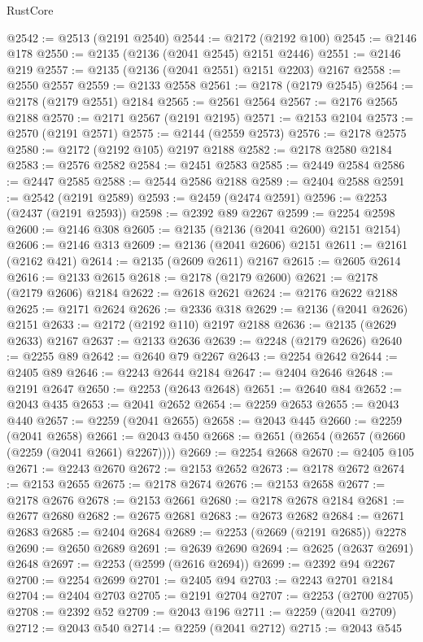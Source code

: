 \begin{lexlean}{RustCore}
\begin{coremodule}
@2542 := @2513 (@2191 @2540)
@2544 := @2172 (@2192 @100)
@2545 := @2146 @178
@2550 := @2135 (@2136 (@2041 @2545) @2151 @2446)
@2551 := @2146 @219
@2557 := @2135 (@2136 (@2041 @2551) @2151 @2203) @2167
@2558 := @2550 @2557
@2559 := @2133 @2558
@2561 := @2178 (@2179 @2545)
@2564 := @2178 (@2179 @2551) @2184
@2565 := @2561 @2564
@2567 := @2176 @2565 @2188
@2570 := @2171 @2567 (@2191 @2195)
@2571 := @2153 @2104
@2573 := @2570 (@2191 @2571)
@2575 := @2144 (@2559 @2573)
@2576 := @2178 @2575
@2580 := @2172 (@2192 @105) @2197 @2188
@2582 := @2178 @2580 @2184
@2583 := @2576 @2582
@2584 := @2451 @2583
@2585 := @2449 @2584
@2586 := @2447 @2585
@2588 := @2544 @2586 @2188
@2589 := @2404 @2588
@2591 := @2542 (@2191 @2589)
@2593 := @2459 (@2474 @2591)
@2596 := @2253 (@2437 (@2191 @2593))
@2598 := @2392 @89 @2267
@2599 := @2254 @2598
@2600 := @2146 @308
@2605 := @2135 (@2136 (@2041 @2600) @2151 @2154)
@2606 := @2146 @313
@2609 := @2136 (@2041 @2606) @2151
@2611 := @2161 (@2162 @421)
@2614 := @2135 (@2609 @2611) @2167
@2615 := @2605 @2614
@2616 := @2133 @2615
@2618 := @2178 (@2179 @2600)
@2621 := @2178 (@2179 @2606) @2184
@2622 := @2618 @2621
@2624 := @2176 @2622 @2188
@2625 := @2171 @2624
@2626 := @2336 @318
@2629 := @2136 (@2041 @2626) @2151
@2633 := @2172 (@2192 @110) @2197 @2188
@2636 := @2135 (@2629 @2633) @2167
@2637 := @2133 @2636
@2639 := @2248 (@2179 @2626)
@2640 := @2255 @89
@2642 := @2640 @79 @2267
@2643 := @2254 @2642
@2644 := @2405 @89
@2646 := @2243 @2644 @2184
@2647 := @2404 @2646
@2648 := @2191 @2647
@2650 := @2253 (@2643 @2648)
@2651 := @2640 @84
@2652 := @2043 @435
@2653 := @2041 @2652
@2654 := @2259 @2653
@2655 := @2043 @440
@2657 := @2259 (@2041 @2655)
@2658 := @2043 @445
@2660 := @2259 (@2041 @2658)
@2661 := @2043 @450
@2668 := @2651 (@2654 (@2657 (@2660 (@2259 (@2041 @2661) @2267))))
@2669 := @2254 @2668
@2670 := @2405 @105
@2671 := @2243 @2670
@2672 := @2153 @2652
@2673 := @2178 @2672
@2674 := @2153 @2655
@2675 := @2178 @2674
@2676 := @2153 @2658
@2677 := @2178 @2676
@2678 := @2153 @2661
@2680 := @2178 @2678 @2184
@2681 := @2677 @2680
@2682 := @2675 @2681
@2683 := @2673 @2682
@2684 := @2671 @2683
@2685 := @2404 @2684
@2689 := @2253 (@2669 (@2191 @2685)) @2278
@2690 := @2650 @2689
@2691 := @2639 @2690
@2694 := @2625 (@2637 @2691) @2648
@2697 := @2253 (@2599 (@2616 @2694))
@2699 := @2392 @94 @2267
@2700 := @2254 @2699
@2701 := @2405 @94
@2703 := @2243 @2701 @2184
@2704 := @2404 @2703
@2705 := @2191 @2704
@2707 := @2253 (@2700 @2705)
@2708 := @2392 @52
@2709 := @2043 @196
@2711 := @2259 (@2041 @2709)
@2712 := @2043 @540
@2714 := @2259 (@2041 @2712)
@2715 := @2043 @545

\end{coremodule}
\end{lexlean}
